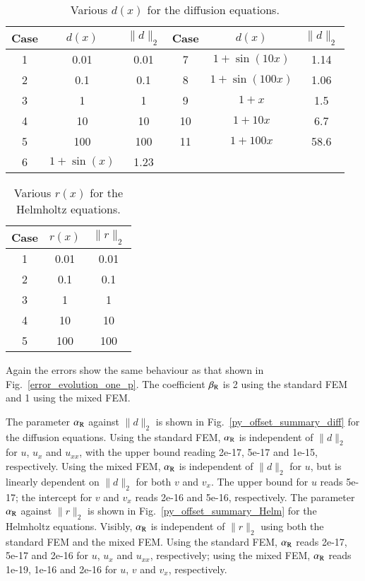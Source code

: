 \documentclass[review,3p]{elsarticle}
\begin{document}
\begin{table}[!ht]
\centering
\caption [w]{Various $d(x)$ for the diffusion equations.} 
\label{d_diffusion_equations}
 \begin{tabular}{c | c | c | c | c | c} \hline
Case &$d(x)$ & $\|d\|_2$ & Case &$d(x)$ & $\|d\|_2$ \\ \hline
1 & 0.01 & 0.01 & 7 & $1+\sin(10x)$ & 1.14 \\ \hline
2 & 0.1 & 0.1 & 8 & $1+\sin(100x)$ & 1.06 \\ \hline
3 & 1 & 1 & 9 & $1+x$ & 1.5 \\ \hline
4 & 10 & 10 & 10 & $1+10x$ & 6.7 \\ \hline
5 & 100 & 100 & 11& $1+100x$ & 58.6 \\ \hline
6 & $1+\sin(x)$ & 1.23 & \multicolumn{3}{c}{} \\ \hline
\end{tabular}
\end{table}

\begin{table}[!ht]
\centering
\caption [w]{Various $r(x)$ for the Helmholtz equations.} 
\label{r_Helmholtz_equations}
 \begin{tabular}{c | c | c} \hline
Case & $r(x)$ & $\|r\|_2$ \\ \hline
1 & 0.01 & 0.01 \\ \hline
2 & 0.1 & 0.1 \\ \hline 
3 & 1 & 1 \\ \hline 
4 & 10 & 10 \\ \hline 
5 & 100 & 100 \\ \hline
\end{tabular}
\end{table}

Again the errors show the same behaviour as that shown in Fig.~\ref{error_evolution_one_p}. The coefficient $\beta_{\rm R}$ is 2 using the standard FEM and 1 using the mixed FEM. 

The parameter $\alpha_{\rm R}$ against $\|d\|_2$ is shown in Fig.~\ref{py_offset_summary_diff} for the diffusion equations. Using the standard FEM, $\alpha_{\rm R}$ is independent of $\|d\|_2$ for $u$, $u_x$ and $u_{xx}$, with the upper bound reading 2e-17, 5e-17 and 1e-15, respectively. Using the mixed FEM, $\alpha_{\rm R}$ is independent of $\|d\|_2$ for $u$, but is linearly dependent on $\|d\|_2$ for both $v$ and $v_x$. The upper bound for $u$ reads 5e-17; the intercept for $v$ and $v_x$ reads 2e-16 and 5e-16, respectively.
The parameter $\alpha_{\rm R}$ against $\|r\|_2$ is shown in Fig.~\ref{py_offset_summary_Helm} for the Helmholtz equations.
Visibly, $\alpha_{\rm R}$ is independent of $\|r\|_2$ using both the standard FEM and the mixed FEM. Using the standard FEM, $\alpha_{\rm R}$ reads 2e-17, 5e-17 and 2e-16 for $u$, $u_x$ and $u_{xx}$, respectively; using the mixed FEM, $\alpha_{\rm R}$ reads 1e-19, 1e-16 and 2e-16 for $u$, $v$ and $v_x$, respectively.
\end{document}
